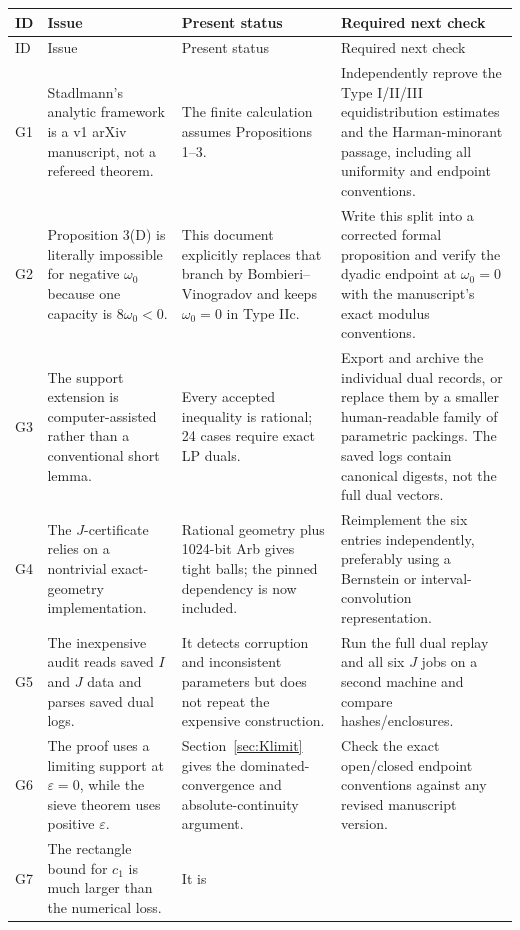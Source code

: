 \documentclass[11pt]{article}
\theoremstyle{definition}
\theoremstyle{remark}
\newcommand{\eps}{\varepsilon}
\begin{document}
\begin{longtable}{p{}p{}p{}p{}}
\toprule
ID&Issue&Present status&Required next check\\
\midrule
\endfirsthead
\toprule
ID&Issue&Present status&Required next check\\
\midrule
\endhead
G1&Stadlmann's analytic framework is a v1 arXiv manuscript, not a refereed
theorem.&The finite calculation assumes Propositions 1--3.&Independently reprove
the Type I/II/III equidistribution estimates and the Harman-minorant passage,
including all uniformity and endpoint conventions.\\
\addlinespace
G2&Proposition 3(D) is literally impossible for negative \(\omega_0\) because
one capacity is \(8\omega_0<0\).&This document explicitly replaces that branch
by Bombieri--Vinogradov and keeps \(\omega_0=0\) in Type IIc.&Write this split
into a corrected formal proposition and verify the dyadic endpoint at
\(\omega_0=0\) with the manuscript's exact modulus conventions.\\
\addlinespace
G3&The support extension is computer-assisted rather than a conventional short
lemma.&Every accepted inequality is rational; 24 cases require exact LP duals.&
Export and archive the individual dual records, or replace them by a smaller
human-readable family of parametric packings.  The saved logs contain canonical
digests, not the full dual vectors.\\
\addlinespace
G4&The \(J\)-certificate relies on a nontrivial exact-geometry implementation.&
Rational geometry plus 1024-bit Arb gives tight balls; the pinned dependency is
now included.&Reimplement the six entries independently, preferably using a
Bernstein or interval-convolution representation.\\
\addlinespace
G5&The inexpensive audit reads saved \(I\) and \(J\) data and parses saved dual
logs.&It detects corruption and inconsistent parameters but does not repeat the
expensive construction.&Run the full dual replay and all six \(J\) jobs on a
second machine and compare hashes/enclosures.\\
\addlinespace
G6&The proof uses a limiting support at \(\eps=0\), while the sieve theorem uses
positive \(\eps\).&Section~\ref{sec:Klimit} gives the dominated-convergence and
absolute-continuity argument.&Check the exact open/closed endpoint conventions
against any revised manuscript version.\\
\addlinespace
G7&The rectangle bound for \(c_1\) is much larger than the numerical loss.&It is

\end{longtable}
\end{document}
